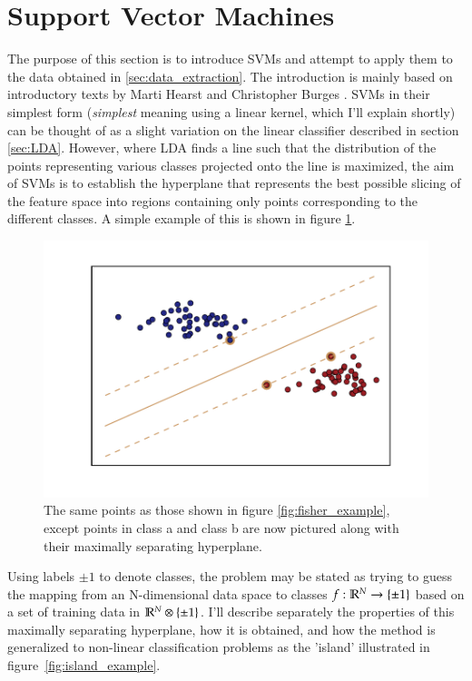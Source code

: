 \section[SVM]{Support Vector Machines}
\label{sec:svm}
The purpose of this section is to introduce SVMs and attempt to apply them to the data obtained in \ref{sec:data_extraction}. The introduction is mainly based on introductory texts by Marti Hearst \cite{hearst1998} and Christopher Burges \cite{burges1998}.
SVMs in their simplest form (\textit{simplest} meaning using a linear kernel, which I'll explain shortly) can be thought of as a slight variation on the linear classifier described in section \ref{sec:LDA}. However, where LDA finds a line such that the distribution of the points representing various classes projected onto the line is maximized, the aim of SVMs is to establish the hyperplane that represents the best possible slicing of the feature space into regions containing only points corresponding to the different classes. A simple example of this is shown in figure \ref{fig:separating_plane_example1}.
\begin{figure}
	\centering
	\includegraphics[width = \figwidth]{pics/ml/hyperplane_lin.pdf}
	\caption{The same points as those shown in figure \ref{fig:fisher_example}, except points in {\color{moerkeroed} class a} and {\color{oldhat} class b} are now pictured along with their {\color{nude} maximally separating hyperplane}.}
	\label{fig:separating_plane_example1}
\end{figure}
Using labels $\pm1$ to denote classes, the problem may be stated as trying to guess the mapping from an N-dimensional data space to classes $f: \mathbb{R}^N \rightarrow \left\{ \pm1 \right\}$ based on a set of training data in $\mathbb{R}^N \otimes \left\{ \pm1 \right\}$. I'll describe separately the properties of this maximally separating hyperplane, how it is obtained, and how the method is generalized to non-linear classification problems as the 'island' illustrated in figure~\ref{fig:island_example}.

